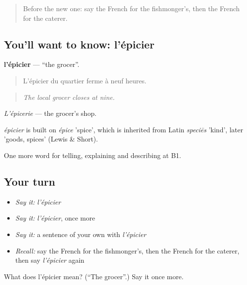 \label{lesson:FR-C444-epicier}



\begin{quote}
Before the new one: say the French for the fishmonger’s, then the French for the caterer.
\end{quote}

\subsection*{You'll want to know: l'épicier}
\textbf{l'épicier} — \textquotedblleft{}the grocer\textquotedblright{}.

\begin{quote}
L'épicier du quartier ferme à neuf heures.
\end{quote}

\begin{quote}
\emph{The local grocer closes at nine.}
\end{quote}

\emph{L'épicerie} — the grocer's shop.

\begin{cousinweb}
\emph{épicier} is built on \emph{épice} 'spice', which is inherited from Latin \emph{speciēs} 'kind', later 'goods, spices' (Lewis \& Short).
\end{cousinweb}

\begin{grammarlens}[title={What you've built}]
One more word for telling, explaining and describing at B1.
\end{grammarlens}

\subsection*{Your turn}
\begin{itemize}
\raggedright
  \item \emph{Say it:} \emph{l'épicier}
  \item \emph{Say it:} \emph{l'épicier}, once more
  \item \emph{Say it:} a sentence of your own with \emph{l'épicier}
  \item \emph{Recall:} say the French for the fishmonger’s, then the French for the caterer, then say \emph{l'épicier} again
\end{itemize}

\begin{tcolorbox}[breakable,colback=teal!4,colframe=teal!35!black,title={Before you move on}]
What does l'épicier mean? (\textquotedblleft{}The grocer\textquotedblright{}.) Say it once more.
\end{tcolorbox}

